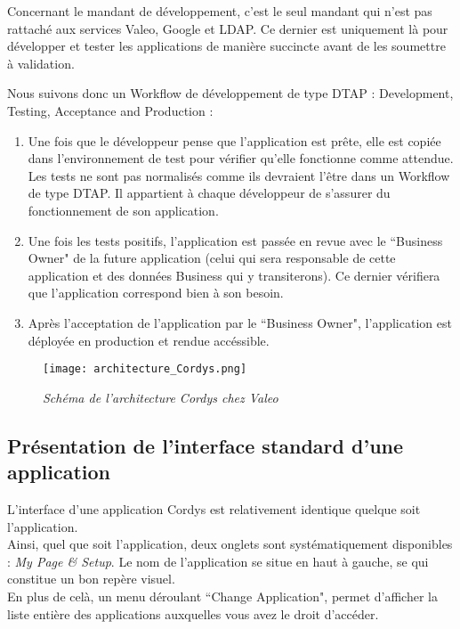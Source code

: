 Concernant le mandant de développement, c'est le seul mandant qui n'est pas rattaché aux services Valeo, Google et LDAP. Ce dernier est uniquement là pour développer et tester les applications de manière succincte  avant de les soumettre à validation.


Nous suivons donc un Workflow de développement de type DTAP : Development, Testing, Acceptance and Production : 

\begin{enumerate}
	\item Une fois que le développeur pense que l'application est prête, elle est copiée dans l'environnement de test pour vérifier qu'elle fonctionne comme attendue.\\
	Les tests ne sont pas normalisés comme ils devraient l'être dans un Workflow de type DTAP. Il appartient à chaque développeur de s'assurer du fonctionnement de son application.\\
	 \item Une fois les tests positifs, l'application est passée en revue avec le ``Business Owner" de la future application (celui qui sera responsable de cette application et des données Business qui y transiterons). Ce dernier vérifiera que l'application correspond bien à son besoin. \\
	 \item Après l'acceptation de l'application par le ``Business Owner", l'application est déployée en production et rendue accéssible.
\end{enumerate}

 \begin{figure}[H]
    \centering
    \texttt{[image: architecture\_Cordys.png]}
	\caption{\textit{Schéma de l'architecture Cordys chez Valeo}}\label{image.architectureCordys} 
\end{figure}

\clearpage

\subsection{Présentation de l'interface standard d'une application}


L'interface d'une application Cordys est relativement identique quelque soit l'application.\\
Ainsi, quel que soit l'application, deux onglets sont systématiquement disponibles : \textit{My Page \& Setup}.
Le nom de l'application se situe en haut à gauche, se qui constitue un bon repère visuel.\\
En plus de celà, un menu déroulant ``Change Application", permet d'afficher la liste entière des applications auxquelles vous avez le droit d'accéder.

